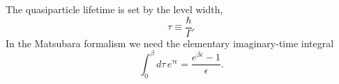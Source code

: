 \documentclass{article}
\begin{document}
The quasiparticle lifetime is set by the level width,
\begin{equation}
\tau \equiv \frac{\hbar}{\Gamma} .
\label{eq:life}
\end{equation}
In the Matsubara formalism we need the elementary imaginary-time integral
\begin{equation}
\int_0^{\beta} d\tau\, e^{\tau\epsilon} = \frac{e^{\beta\epsilon}-1}{\epsilon} .
\label{eq:tau}
\end{equation}
\end{document}
